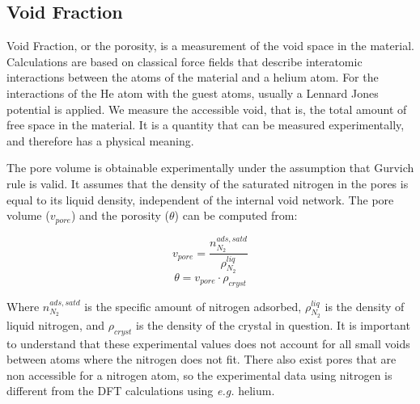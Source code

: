 \pagebreak
\subsection{Void Fraction} \label{sec:Void_Fraction}

	Void Fraction, or the porosity, is a measurement of the void space in the material. Calculations are based on classical force fields that describe interatomic interactions between the atoms of the material and a helium atom. For the interactions of the He atom with the guest atoms, usually a Lennard Jones potential is applied. We measure the accessible void, that is, the total amount of free space in the material. It is a quantity that can be measured experimentally, and therefore has a physical meaning. 
			
	The pore volume is obtainable experimentally under the assumption that Gurvich rule is valid. It assumes that the density of the saturated nitrogen in the pores is equal to its liquid density, independent of the internal void network. 
The pore volume ($v_{pore}$) and the porosity ($\theta$) can be  computed from:

\begin{equation}
v_{pore} = \frac{n^{ads,satd}_{N_2}}{\rho^{liq}_{N_2}}
\end{equation}
\begin{equation}
\theta = v_{pore} \cdot \rho_{cryst}
\end{equation} 

	Where $n^{ads,satd}_{N_2}$ is the specific amount of nitrogen adsorbed, $\rho^{liq}_{N_2}$ is the density of liquid nitrogen, and $\rho_{cryst}$ is the density of the crystal in question. It is important to understand that these experimental values does not account for all small voids between atoms where the nitrogen does not fit. There also exist pores that are non accessible for a nitrogen atom, so the experimental data using nitrogen is different from the DFT calculations using \textit{e.g.} helium.

